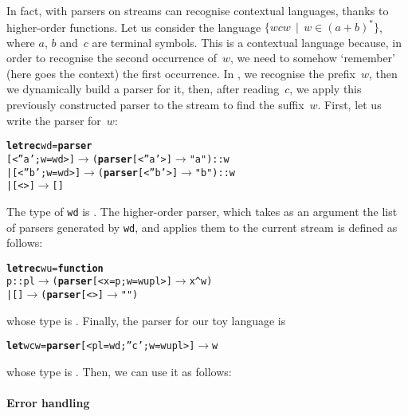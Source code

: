 In fact, \OCaml with parsers on streams can recognise contextual
languages, thanks to higher\hyp{}order functions. Let us consider the
language \(\{wcw \,\mid\, w \in (a+b)^*\}\), where \(a\), \(b\)
and~\(c\) are terminal symbols. This is a contextual language because,
in order to recognise the second occurrence of~\(w\), we need to
somehow `remember' (here goes the context) the first occurrence. In
\OCaml, we recognise the prefix~\(w\), then we dynamically build a
parser for it, then, after reading~\(c\), we apply this previously
constructed parser to the stream to find the suffix~\(w\). First, let
us write the parser for~\(w\):
\begin{alltt}
\textbf{let} \textbf{rec} wd = \textbf{parser}
  [< ''a'; w=wd >] \(\rightarrow\) (\textbf{parser} [< ''a' >] \(\rightarrow\) "a")::w
| [< ''b'; w=wd >] \(\rightarrow\) (\textbf{parser} [< ''b' >] \(\rightarrow\) "b")::w
|             [<>] \(\rightarrow\) []
\end{alltt}
The type of \texttt{wd} is . The higher\hyp{}order parser,
which takes as an argument the list of parsers generated by
\texttt{wd}, and applies them to the current stream is defined as
follows:
\begin{alltt}
\textbf{let} \textbf{rec} wu = \textbf{function}
  p::pl \(\rightarrow\) (\textbf{parser} [< x=p; w=wu pl >] \(\rightarrow\) x^w)
|    [] \(\rightarrow\) (\textbf{parser} [<>] \(\rightarrow\) "")
\end{alltt}
whose type is . Finally, the
parser for our toy language is
\begin{alltt}
\textbf{let} wcw = \textbf{parser} [< pl=wd; ''c'; w=wu pl >] \(\rightarrow\) w
\end{alltt}
whose type is . Then, we
can use it as follows:

\bigskip

\noindent{}

\noindent{}


\paragraph{Error handling}


